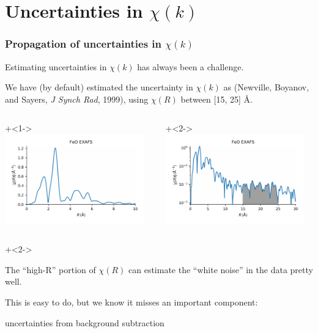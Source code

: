 \section{Uncertainties in $\chi(k)$}
\begin{frame}\frametitle{Propagation of uncertainties in $\chi(k)$}

\begin{cenpage}{135mm}

  Estimating uncertainties in  $\chi(k)$ has always been a challenge.

  \vmm

  We have (by default) estimated the uncertainty in $\chi(k)$ as
  {} {\tiny{(Newville, Boyanov, and Sayers, {\emph{J
          Synch Rad}}, 1999)}}, using $\chi(R)$ between [15, 25] \AA.

\begin{columns}
  \begin{column}[T]{60mm}

    {\onslide+<1->  \includegraphics[width=60mm]{figs/errors/feo_chir}  }


  \end{column}
  \begin{column}[T]{60mm}

    {\onslide+<2-> \includegraphics[width=60mm]{figs/errors/feo_chir_logscale} }

  \end{column}
\end{columns}

{\onslide+<2->

  \begin{cenpage}{105mm}


    The ``high-R'' portion of $\chi(R)$ can estimate the
    ``white noise'' in the data pretty well.

    \vmm
    This is easy to do, but we know it misses an important component:
  \end{cenpage}


  \begin{postitbox}{63mm}
      {uncertainties from  background subtraction}
  \end{postitbox}

}
\end{cenpage}

\end{frame}


